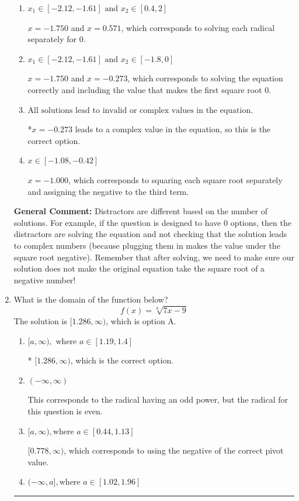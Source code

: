 \documentclass{extbook}[14pt]
\newcommand{\litem}[1]{\item #1

\rule{\textwidth}{0.4pt}}
\begin{document}
\begin{enumerate}
{\begin{enumerate}[label=\Alph*.]
This corresponds to not checking that the potential solution $x = -0.273$ leads to a complex value in the original equation.
\item \( x_1 \in [-2.12, -1.61] \text{ and } x_2 \in [0.4,2] \)

$x = -1.750$ and $x = 0.571$, which corresponds to solving each radical separately for 0.
\item \( x_1 \in [-2.12, -1.61] \text{ and } x_2 \in [-1.8,0] \)

$x = -1.750$ and $x = -0.273$, which corresponds to solving the equation correctly and including the value that makes the first square root 0.
\item \( \text{All solutions lead to invalid or complex values in the equation.} \)

*$x = -0.273$ leads to a complex value in the equation, so this is the correct option.
\item \( x \in [-1.08,-0.42] \)

$x = -1.000$, which corresponds to squaring each square root separately and assigning the negative to the third term.
\end{enumerate}

\textbf{General Comment:} Distractors are different based on the number of solutions. For example, if the question is designed to have 0 options, then the distractors are solving the equation and not checking that the solution leads to complex numbers (because plugging them in makes the value under the square root negative). Remember that after solving, we need to make sure our solution does not make the original equation take the square root of a negative number!
}
\litem{
What is the domain of the function below?
\[ f(x) = \sqrt[6]{7 x - 9} \]The solution is \( [1.286, \infty) \), which is option A.\begin{enumerate}[label=\Alph*.]
\item \( [a, \infty), \text{ where } a \in [1.19, 1.4] \)

* $[1.286, \infty)$, which is the correct option.
\item \( (-\infty, \infty) \)

This corresponds to the radical having an odd power, but the radical for this question is even.
\item \( [a, \infty), \text{where } a \in [0.44, 1.13] \)

$[0.778, \infty)$, which corresponds to using the negative of the correct pivot value.
\item \( (-\infty, a], \text{where } a \in [1.02, 1.96] \)


\end{enumerate}}
\end{enumerate}
\end{document}
